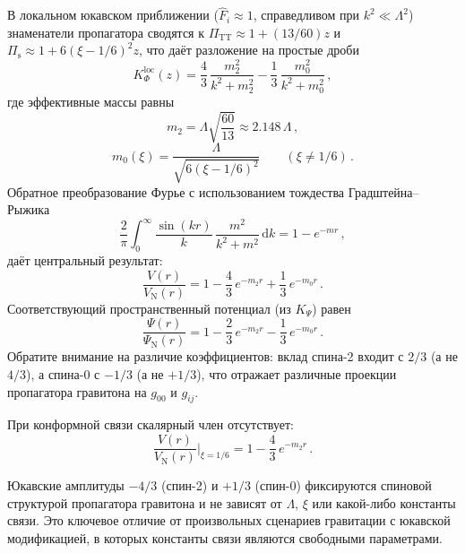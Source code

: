\documentclass[aps,prd,twocolumn,superscriptaddress,nofootinbib,floatfix]{revtex4-2}
\newcommand{\dd}{\mathrm{d}}
\newcommand{\PiTT}{\Pi_{\mathrm{TT}}}
\newcommand{\Pis}{\Pi_{\mathrm{s}}}
\begin{document}
В локальном юкавском приближении
($\hat{F}_i \approx 1$, справедливом при $k^2 \ll \Lambda^2$)
знаменатели пропагатора сводятся к $\PiTT \approx 1 + (13/60)z$ и
$\Pis \approx 1 + 6(\xi-1/6)^2 z$, что даёт разложение на простые
дроби
\begin{equation}
  K_\Phi^{\mathrm{loc}}(z) = \frac{4}{3}\,\frac{m_2^2}{k^2+m_2^2}
  - \frac{1}{3}\,\frac{m_0^2}{k^2+m_0^2}\,,
\end{equation}
где эффективные массы равны
\begin{equation}
  m_2 = \Lambda\sqrt{\frac{60}{13}} \approx 2.148\,\Lambda\,,
  \label{eq:m2}
\end{equation}
\begin{equation}
  m_0(\xi) = \frac{\Lambda}{\sqrt{6(\xi - 1/6)^2}}
  \qquad (\xi \neq 1/6)\,.
  \label{eq:m0}
\end{equation}
Обратное преобразование Фурье с использованием тождества
Градштейна--Рыжика
\begin{equation}
  \frac{2}{\pi}\int_0^\infty
  \frac{\sin(kr)}{k}\,\frac{m^2}{k^2+m^2}\,\dd k
  = 1 - e^{-mr}\,,
\end{equation}
даёт центральный результат:
\begin{equation}
  \boxed{
    \frac{V(r)}{V_{\mathrm{N}}(r)}
    = 1 - \frac{4}{3}\,e^{-m_2 r} + \frac{1}{3}\,e^{-m_0 r}\,.}
  \label{eq:V}
\end{equation}
Соответствующий пространственный потенциал (из $K_\Psi$) равен
\begin{equation}
  \frac{\Psi(r)}{\Psi_{\mathrm{N}}(r)}
  = 1 - \frac{2}{3}\,e^{-m_2 r} - \frac{1}{3}\,e^{-m_0 r}\,.
  \label{eq:Psi}
\end{equation}
Обратите внимание на различие коэффициентов: вклад спина-2 входит с
$2/3$ (а не $4/3$), а спина-0 с $-1/3$ (а не $+1/3$), что отражает
различные проекции пропагатора гравитона на $g_{00}$ и $g_{ij}$.

При конформной связи скалярный член отсутствует:
\begin{equation}
  \frac{V(r)}{V_{\mathrm{N}}(r)}\bigg|_{\xi=1/6}
  = 1 - \frac{4}{3}\,e^{-m_2 r}\,.
  \label{eq:V-conformal}
\end{equation}

Юкавские амплитуды $-4/3$ (спин-2) и $+1/3$ (спин-0) фиксируются
спиновой структурой пропагатора гравитона и не зависят от $\Lambda$,
$\xi$ или какой-либо константы связи. Это ключевое отличие от
произвольных сценариев гравитации с юкавской модификацией, в которых
константы связи являются свободными параметрами.
\end{document}
